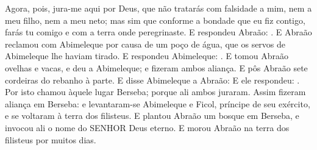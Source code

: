 {{{Agora, pois, jura-me aqui por Deus, que não tratarás com falsidade a mim, nem a meu filho, nem a meu neto; mas sim que conforme a bondade que eu fiz contigo, farás tu comigo e com a terra onde peregrinaste}.
E respondeu Abraão: .
E Abraão reclamou com Abimeleque por causa de um poço de água, que os servos de Abimeleque lhe haviam tirado.
E respondeu Abimeleque: .
E tomou Abraão ovelhas e vacas, e deu a Abimeleque; e fizeram ambos aliança.
E pôs Abraão sete cordeiras do rebanho à parte.
E disse Abimeleque a Abraão: 
E ele respondeu: .
Por isto chamou àquele
lugar Berseba; porque ali ambos juraram. %
Assim fizeram aliança em Berseba: e levantaram-se Abimeleque e Ficol, príncipe de seu exército, e se voltaram à terra dos filisteus.
E plantou Abraão um bosque em Berseba, e invocou ali o nome do SENHOR Deus eterno.
E morou Abraão na terra dos filisteus por muitos dias.
\par}

}

